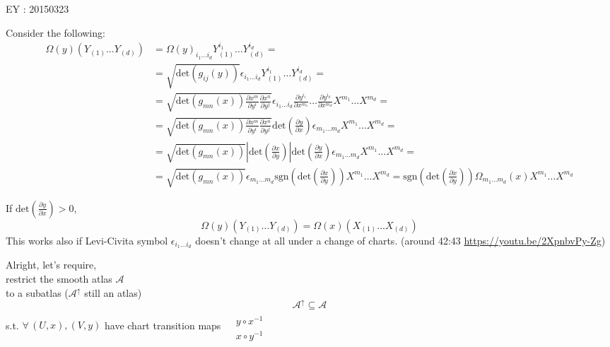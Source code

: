 \documentclass[10pt]{amsart}
\begin{document}
\begin{multicols*}{2}
	EY : 20150323 
	
	Consider the following:
	\[
	\begin{aligned}
	\Omega(y)(Y_{(1)} \dots Y_{(d)} ) & = \Omega(y)_{i_1 \dots i_d}Y_{(1)}^{i_1} \dots Y_{(d)}^{i_d} =  \\
	& = \sqrt{ \text{det}(g_{ij}(y)) } \epsilon_{i_1 \dots i_d} Y^{i_1}_{(1)} \dots Y^{i_d}_{(d)} = \\
	& = \sqrt{ \text{det}(g_{mn}(x)) \frac{ \partial x^m}{ \partial y^i} \frac{ \partial x^n }{ \partial y^j} } \epsilon_{i_1 \dots i_d} \frac{ \partial y^{i_1}}{ \partial x^{m_1} } \dots \frac{ \partial y^{i_d} }{ \partial x^{m_d} } X^{m_1} \dots X^{m_d}  = \\
	& = \sqrt{ \text{det}(g_{mn}(x))\frac{ \partial x^m}{ \partial y^i} \frac{ \partial x^n}{ \partial y^j}} \text{det}\left( \frac{ \partial y}{ \partial x}\right) \epsilon_{m_1 \dots m_d} X^{m_1} \dots X^{m_d} = \\
	& = \sqrt{ \text{det}(g_{mn}(x)) } \left| \text{det}\left( \frac{ \partial x}{ \partial y} \right) \right| \text{det}\left( \frac{ \partial y}{ \partial x} \right) \epsilon_{m_1 \dots m_d} X^{m_1} \dots X^{m_d} = \\
	& = \sqrt{\text{det}(g_{mn}(x))} \epsilon_{m_1 \dots m_d} \text{sgn}\left(\text{det}\left( \frac{ \partial x}{ \partial y} \right) \right) X^{m_1} \dots X^{m_d} = \text{sgn}(\text{det}\left( \frac{ \partial x}{ \partial y} \right)) \Omega_{m_1 \dots m_d}(x) X^{m_1} \dots X^{m_d}
	\end{aligned}
	\]
	
	If $\text{det}\left( \frac{ \partial y}{ \partial x} \right) > 0$, 
	\[
	\Omega(y)(Y_{(1)} \dots Y_{(d)})  = \Omega(x)(X_{(1)} \dots X_{(d)} )
	\]
	This works also if Levi-Civita symbol $\epsilon_{i_1\dots i_d}$ doesn't change at all under a change of charts. (around 42:43 \url{https://youtu.be/2XpnbvPy-Zg})
	
	\hrulefill
	
	Alright, let's require, \\
	\phantom{\quad \, } restrict the smooth atlas $\mathcal{A}$ \\
	\phantom{\quad \quad \, } to a subatlas ($\mathcal{A}^{\uparrow}$ still an atlas) 
	\[
	\mathcal{A}^{\uparrow} \subseteq \mathcal{A}
	\]
	s.t. $\forall \, (U,x), (V,y)$ have chart transition maps $\begin{aligned} & \quad \\ 
	& y\circ x^{-1} \\ 
	& x\circ y^{-1} \end{aligned}$
	

\end{multicols*}
\end{document}
